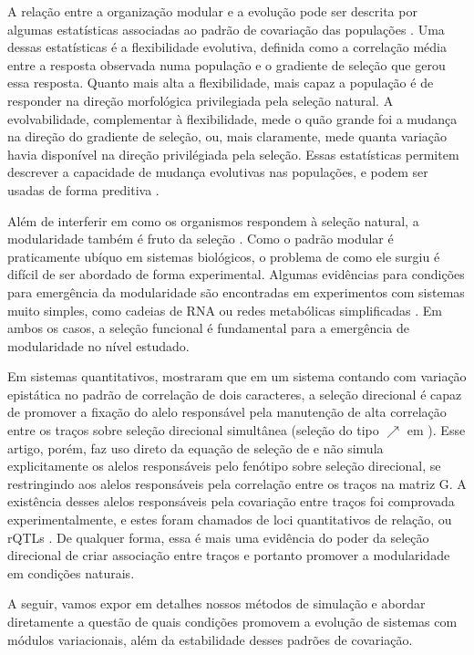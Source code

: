 \documentclass[a4paper, 12pt, titlepage, onecolumn]{article}
\numberwithin{equation}{section}
\numberwithin{table}{section}
\begin{document}
A relação entre a organização modular e a evolução pode ser descrita por
algumas estatísticas associadas ao padrão de covariação das populações
\citep{Hansen2008}. Uma dessas estatísticas é a flexibilidade evolutiva, definida
como a correlação média entre a resposta observada numa população e o
gradiente de seleção que gerou essa resposta. Quanto mais alta a
flexibilidade, mais capaz a população é de responder na direção morfológica
privilegiada pela seleção natural. A evolvabilidade, complementar à 
flexibilidade, mede o quão grande foi a mudança na direção do gradiente
de seleção, ou, mais claramente, mede quanta variação havia disponível
na direção privilégiada pela seleção. Essas estatísticas permitem
descrever a capacidade de mudança evolutivas nas populações, e podem ser usadas de
forma preditiva \citep{Marroig2010}. 

Além de interferir em como os organismos respondem à seleção natural, a
modularidade também é fruto da seleção \citep{Wagner1996, Wagner2007}. 
Como o padrão modular é praticamente ubíquo em sistemas biológicos, o
problema de como ele surgiu é difícil de ser abordado de forma
experimental. Algumas evidências para condições para emergência da
modularidade são encontradas em experimentos com sistemas muito simples,
como cadeias de RNA \citep{Ancel2000} ou redes metabólicas
simplificadas \citep{Espinosa-Soto2010}. Em ambos os casos, a seleção
funcional é fundamental para a emergência de modularidade no nível
estudado.

Em sistemas quantitativos, \cite{Pavlicev2010} mostraram que em um sistema
contando com variação epistática no padrão de correlação de dois
caracteres, a seleção direcional é capaz de promover a fixação do alelo
responsável pela manutenção de alta correlação entre os traços sobre
seleção direcional simultânea  (seleção do tipo
$\nearrow$ em \cite{Jones2004}). Esse artigo, porém, faz uso direto da
equação de seleção de \cite{Lande1979} e não simula explicitamente os
alelos responsáveis pelo fenótipo sobre seleção direcional, se restringindo aos
alelos responsáveis pela correlação entre os traços na matriz G. A
existência desses alelos responsáveis pela covariação entre traços foi
comprovada experimentalmente, e estes foram chamados de loci
quantitativos de relação, ou rQTLs \citep{Pavlicev2008a}.  De qualquer
forma, essa é mais uma evidência do poder da seleção direcional de criar
associação entre traços e portanto promover a modularidade em condições
naturais.

A seguir, vamos expor em detalhes nossos métodos de simulação e abordar
diretamente a questão de quais condições promovem a evolução de
sistemas com módulos variacionais, além da estabilidade desses padrões de covariação.
\end{document}
